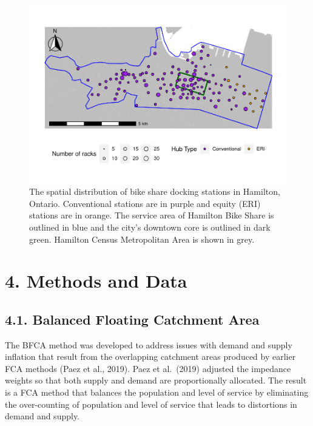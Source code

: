 \documentclass[]{elsarticle} %
\begin{document}
\begin{figure}

{\centering \includegraphics[width=1\linewidth]{Bike-share-spatial-equity_files/figure-latex/sobi-stations-in-hamilton-1} 

}

\caption{The spatial distribution of bike share docking stations in Hamilton, Ontario. Conventional stations are in purple and equity (ERI) stations are in orange. The service area of Hamilton Bike Share is outlined in blue and the city's downtown core is outlined in dark green. Hamilton Census Metropolitan Area is shown in grey.}\label{fig:sobi-stations-in-hamilton}
\end{figure}

\hypertarget{sec:methods}{%
\section{4. Methods and Data}\label{sec:methods}}

\hypertarget{balanced-floating-catchment-area}{%
\subsection{4.1. Balanced Floating Catchment
Area}\label{balanced-floating-catchment-area}}

The BFCA method was developed to address issues with demand and supply
inflation that result from the overlapping catchment areas produced by
earlier FCA methods (Paez et al., 2019). Paez et al.~(2019) adjusted the
impedance weights so that both supply and demand are proportionally
allocated. The result is a FCA method that balances the population and
level of service by eliminating the over-counting of population and
level of service that leads to distortions in demand and supply.
\end{document}
